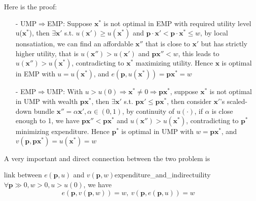 Here is the proof:
\begin{enumerate}
    \item[-] UMP$\Rightarrow$EMP: Suppose $\mathbf{x}^*$ is not optimal in EMP with required utility level u($\mathbf{x}^*$), then $\exists \mathbf{x}'$ s.t. $u(\mathbf{x}')\geq u(\mathbf{x}^*)$ and $\mathbf{p}\cdot\mathbf{x}'<\mathbf{p}\cdot\mathbf{x}^*\leq w$, by local nonsatiation, we can find an affordable $\mathbf{x}''$ that is close to $\mathbf{x}'$ but has strictly higher utility, that is $u(\mathbf{x}'')>u(\mathbf{x}')$ and $\mathbf{p}\mathbf{x}''< w$, this leads to $u(\mathbf{x}'')>u(\mathbf{x}^*)$, contradicting to $\mathbf{x}^*$ maximizing utility. Hence $\mathbf{x}$ is optimal in EMP with $u=u(\mathbf{x}^*)$, and $e(\mathbf{p},u(\mathbf{x}^*))=\mathbf{p}\mathbf{x}^*=w$
    \item[-] EMP$\Rightarrow$UMP: With $u>u(0)\Rightarrow \mathbf{x}^*\neq 0\Rightarrow \mathbf{p}\mathbf{x}^*$, suppose $\mathbf{x}^*$ is not optimal in UMP with wealth $\mathbf{p}\mathbf{x}^*$, then $\exists \mathbf{x}'$ s.t. $\mathbf{p}\mathbf{x}'\leq \mathbf{p}\mathbf{x}^*$, then consider $\mathbf{x}'$'s scaled-down bundle $\mathbf{x}''=\alpha \mathbf{x}',\alpha\in(0,1)$, by continuity of $u(\cdot)$, if $\alpha$ is close enough to 1, we have $\mathbf{p}\mathbf{x}''<\mathbf{p}\mathbf{x}^*$ and $u(\mathbf{x}'')>u(\mathbf{x}^*)$, contradicting to $\mathbf{p}^*$ minimizing expenditure. Hence $\mathbf{p}^*$ is optimal in UMP with $w=\mathbf{p}\mathbf{x}^*$, and $v(\mathbf{p},\mathbf{p}\mathbf{x}^*)=u(\mathbf{x}^*)=w$
\end{enumerate}

A very important and direct connection between the two problem is 
\begin{proposition}{link between $e(\mathbf{p},u)$ and $v(\mathbf{p},w)$}{expenditure_and_indirectuility}
    $\forall \mathbf{p}\gg 0,w>0,u>u(0)$, we have $$e(\mathbf{p},v(\mathbf{p},w))=w,\ v(\mathbf{p},e(\mathbf{p},u))=w$$
\end{proposition}


